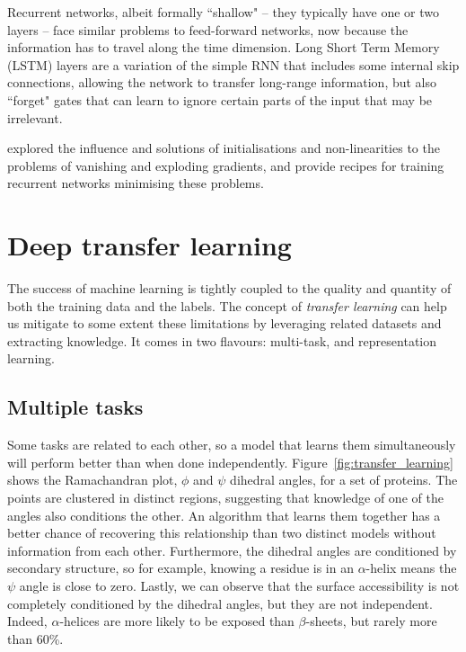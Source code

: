 Recurrent networks,  albeit formally ``shallow" -- they typically have one or two layers -- face similar problems to feed-forward networks, now because the information has to travel along the time dimension.
Long Short Term Memory (LSTM) layers are a variation of the simple RNN that includes some internal skip connections, allowing the network to transfer long-range information, but also ``forget" gates that can learn to ignore certain parts of the input that may be irrelevant.

\citet{difficult_recurrent} explored the influence and solutions of initialisations and non-linearities to the problems of vanishing and exploding gradients, and provide recipes for training recurrent networks minimising these problems.


\section{Deep transfer learning}
The success of machine learning is tightly coupled to the quality and quantity of both the training data and the labels.
The concept of \emph{transfer learning} can help us mitigate to some extent these limitations by leveraging related datasets and extracting knowledge.
It comes in two flavours: multi-task, and representation learning.

\subsection{Multiple tasks}
Some tasks are related to each other, so a model that learns them simultaneously will perform better than when done independently.
Figure~\ref{fig:transfer_learning} shows the Ramachandran plot,  $\phi$ and $\psi$ dihedral angles, for a set of proteins.
The points are clustered in distinct regions, suggesting that knowledge of one of the angles also conditions the other.
An algorithm that learns them together has a better chance of recovering this relationship than two distinct models without information from each other.
Furthermore, the dihedral angles are conditioned by secondary structure, so for example, knowing a residue is in an $\alpha$-helix means the $\psi$ angle is close to zero.
Lastly, we can observe that the surface accessibility is not completely conditioned by the dihedral angles, but they are not independent.
Indeed, $\alpha$-helices are more likely to be exposed than $\beta$-sheets, but rarely more than 60\%.

